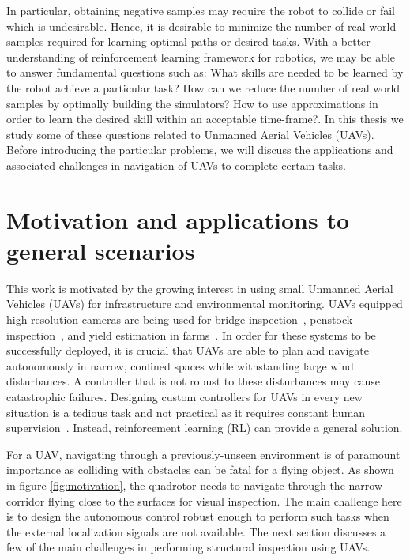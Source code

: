 \documentclass[12pt]{report}
\begin{document}
In particular, obtaining negative samples may require the robot to collide or fail which is undesirable. Hence, it is desirable to minimize the number of real world samples required for learning optimal paths or desired tasks. With a better understanding of reinforcement learning framework for robotics, we may be able to answer fundamental questions such as: What skills are needed to be learned by the robot achieve a particular task? How can we reduce the number of real world samples by optimally building the simulators? How to use approximations in order to learn the desired skill within an acceptable time-frame?. In this thesis we study some of these questions related to Unmanned Aerial Vehicles (UAVs). Before introducing the particular problems, we will discuss the applications and associated challenges in navigation of UAVs to complete certain tasks.

\section{Motivation and applications to general scenarios} 
This work is motivated by the growing interest in using small Unmanned Aerial Vehicles (UAVs) for infrastructure and environmental monitoring. UAVs equipped high resolution cameras are being used for bridge inspection~\cite{liu2014review}, penstock inspection~\cite{ozaslaninspection}, and yield estimation in farms~\cite{das2015devices}. In order for these systems to be successfully deployed, it is crucial that UAVs are able to plan and navigate autonomously in narrow, confined spaces while withstanding large wind disturbances. A controller that is not robust to these disturbances may cause catastrophic failures. Designing custom controllers for UAVs in every new situation is a tedious task and not practical as it requires constant human supervision~\cite{kober2012reinforcement}. Instead, reinforcement learning (RL) can provide a general solution.\par 
For a UAV, navigating through a previously-unseen environment is of paramount importance as colliding with obstacles can be fatal for a flying object. As shown in figure \ref{fig:motivation}, the quadrotor needs to navigate through the narrow corridor flying close to the surfaces for visual inspection. The main challenge here is to design the autonomous control robust enough to perform such tasks when the external localization signals are not available. The next section discusses a few of the main challenges in performing structural inspection using UAVs.
\end{document}
